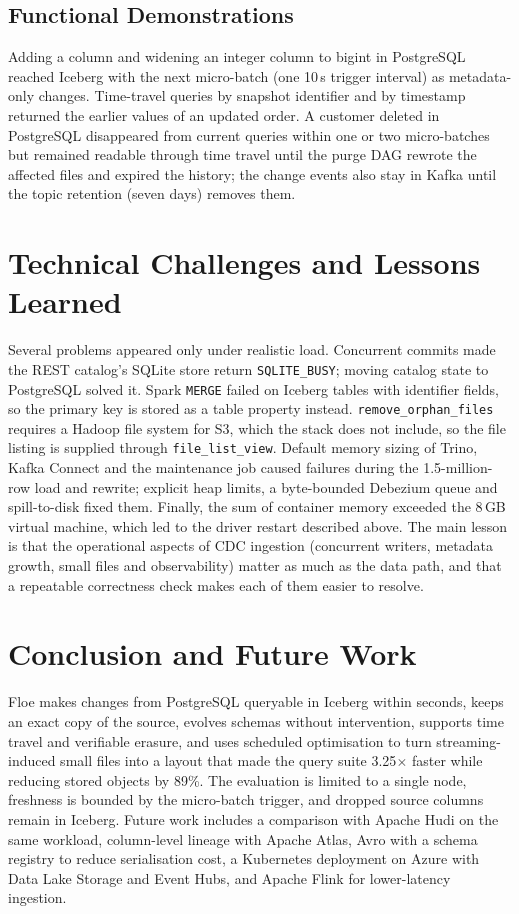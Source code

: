 \documentclass[conference,a4paper]{IEEEtran}
\newcommand{\code}[1]{\texttt{#1}}
\begin{document}
\subsection{Functional Demonstrations}
Adding a column and widening an integer column to bigint in PostgreSQL reached Iceberg with the next
micro-batch (one 10\,s trigger interval) as metadata-only changes. Time-travel queries by snapshot identifier and by timestamp returned the earlier values of an
updated order. A customer deleted in PostgreSQL disappeared from current queries within one or two micro-batches but remained
readable through time travel until the purge DAG rewrote the affected files and expired the history; the change
events also stay in Kafka until the topic retention (seven days) removes them.

\section{Technical Challenges and Lessons Learned}
Several problems appeared only under realistic load. Concurrent commits made the REST catalog's SQLite store return
\code{SQLITE\_BUSY}; moving catalog state to PostgreSQL solved it. Spark \code{MERGE} failed on Iceberg tables with
identifier fields, so the primary key is stored as a table property instead. \code{remove\_orphan\_files} requires a
Hadoop file system for S3, which the stack does not include, so the file listing is supplied through
\code{file\_list\_view}. Default memory sizing of Trino, Kafka Connect and the maintenance job caused failures during
the 1.5-million-row load and rewrite; explicit heap limits, a byte-bounded Debezium queue and spill-to-disk fixed them.
Finally, the sum of container memory exceeded the 8\,GB virtual machine, which led to the driver restart described
above. The main lesson is that the operational aspects of CDC ingestion (concurrent writers, metadata growth, small
files and observability) matter as much as the data path, and that a repeatable correctness check makes each of them
easier to resolve.

\section{Conclusion and Future Work}
Floe makes changes from PostgreSQL queryable in Iceberg within seconds, keeps an exact copy of the source, evolves
schemas without intervention, supports time travel and verifiable erasure, and uses scheduled optimisation to turn
streaming-induced small files into a layout that made the query suite 3.25$\times$ faster while reducing stored
objects by 89\%. The evaluation is limited to a single node, freshness is bounded by the micro-batch trigger,
and dropped source columns remain in Iceberg. Future work includes a comparison with Apache Hudi on the same
workload, column-level lineage with Apache Atlas, Avro with a schema registry to reduce serialisation cost, a
Kubernetes deployment on Azure with Data Lake Storage and Event Hubs, and Apache Flink for lower-latency ingestion.
\end{document}
